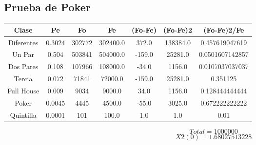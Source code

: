 \documentclass{article}
\begin{document}
\subsection{Prueba de Poker}
\begin{tabular}{|c|c|c|c|c|c|c|}
Clase&Pe&Fo&Fe&(Fo{-}Fe)&(Fo{-}Fe)2&(Fo{-}Fe)2/Fe\\
\hline
Diferentes&0.3024&302772&302400.0&372.0&138384.0&0.457619047619\\
\hline
Un Par&0.504&503841&504000.0&{-}159.0&25281.0&0.0501607142857\\
\hline
Dos Pares&0.108&107966&108000.0&{-}34.0&1156.0&0.0107037037037\\
\hline
Tercia&0.072&71841&72000.0&{-}159.0&25281.0&0.351125\\
\hline
Full House&0.009&9034&9000.0&34.0&1156.0&0.128444444444\\
\hline
Poker&0.0045&4445&4500.0&{-}55.0&3025.0&0.672222222222\\
\hline
Quintilla&0.0001&101&100.0&1.0&1.0&0.01\\
\end{tabular}
$$
Total = 1000000
$$
$$
X2(0) = 1.68027513228
$$
\end{document}
